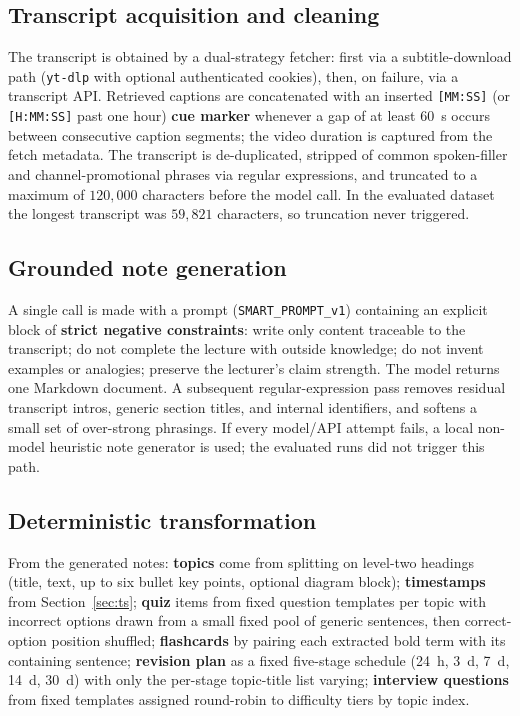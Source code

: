 \documentclass[conference]{IEEEtran}
\begin{document}
\subsection{Transcript acquisition and cleaning}
The transcript is obtained by a dual-strategy fetcher: first via a subtitle-download path (\texttt{yt-dlp} with optional authenticated cookies), then, on failure, via a transcript API. Retrieved captions are concatenated with an inserted \texttt{[MM:SS]} (or \texttt{[H:MM:SS]} past one hour) \textbf{cue marker} whenever a gap of at least 60~s occurs between consecutive caption segments; the video duration is captured from the fetch metadata. The transcript is de-duplicated, stripped of common spoken-filler and channel-promotional phrases via regular expressions, and truncated to a maximum of $120{,}000$ characters before the model call. In the evaluated dataset the longest transcript was $59{,}821$ characters, so truncation never triggered.

\subsection{Grounded note generation}
A single call is made with a prompt (\texttt{SMART\_PROMPT\_v1}) containing an explicit block of \textbf{strict negative constraints}: write only content traceable to the transcript; do not complete the lecture with outside knowledge; do not invent examples or analogies; preserve the lecturer's claim strength. The model returns one Markdown document. A subsequent regular-expression pass removes residual transcript intros, generic section titles, and internal identifiers, and softens a small set of over-strong phrasings. If every model/API attempt fails, a local non-model heuristic note generator is used; the evaluated runs did not trigger this path.

\subsection{Deterministic transformation}
From the generated notes: \textbf{topics} come from splitting on level-two headings (title, text, up to six bullet key points, optional diagram block); \textbf{timestamps} from Section~\ref{sec:ts}; \textbf{quiz} items from fixed question templates per topic with incorrect options drawn from a small fixed pool of generic sentences, then correct-option position shuffled; \textbf{flashcards} by pairing each extracted bold term with its containing sentence; \textbf{revision plan} as a fixed five-stage schedule (24~h, 3~d, 7~d, 14~d, 30~d) with only the per-stage topic-title list varying; \textbf{interview questions} from fixed templates assigned round-robin to difficulty tiers by topic index.
\end{document}
